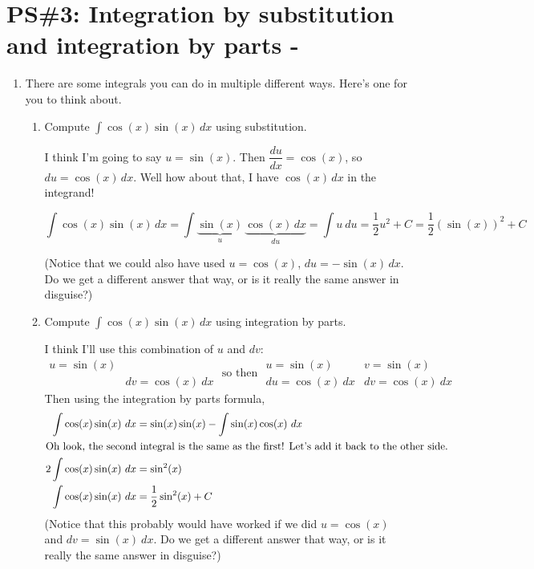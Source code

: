 


%


\allowdisplaybreaks
\section{PS\#3:  Integration by substitution and integration by parts -  }

\everymath{\displaystyle}
\begin{enumerate}[leftmargin=0pt]

\item There are some integrals you can do in multiple different ways. Here's one for you to think about.
\begin{enumerate}
    \item Compute $\int\cos(x)\sin(x)\, dx$ using substitution.
    
    \begin{red}
    I think I'm going to say $u = \sin(x)$. Then $\dfrac{du}{dx} = \cos(x)$, so $du = \cos(x)\, dx$. Well how about that, I have $\cos(x)\, dx$ in the integrand!
    
    \[\int\cos(x)\sin(x)\, dx = \int\underbrace{\sin(x)}_{u}\, \underbrace{\cos(x)\, dx}_{du} = \int u\ du = \frac12 u^2 + C = \frac12 (\sin(x))^2 + C\]
    
    (Notice that we could also have used $u = \cos(x)$, $du = -\sin(x)\, dx$. Do we get a different answer that way, or is it really the same answer in disguise?)
    \end{red}
    \item Compute $\int\cos(x)\sin(x)\, dx$ using integration by parts.
    
    \begin{red}
    I think I'll use this combination of $u$ and $dv$:
    \[\begin{array}{ll}
    u = \sin(x) & \\
     & dv = \cos(x)\ dx
    \end{array}
    \textrm{ so then }
    \begin{array}{ll}
        u = \sin(x) & v = \sin(x) \\
        du = \cos(x)\ dx & dv = \cos(x)\ dx
    \end{array}
    \]
    Then using the integration by parts formula, 
    \begin{align*}
        \int\cos(x)\sin(x)\ dx &= \sin(x)\sin(x) - \int\sin(x)\cos(x)\ dx \\
        \intertext{Oh look, the second integral is the same as the first! Let's add it back to the other side.}
        2\int\cos(x)\sin(x)\ dx &= \sin^2(x) \\
        \int\cos(x)\sin(x)\ dx &= \frac12 \sin^2(x) + C
    \end{align*}
    (Notice that this probably would have worked if we did $u = \cos(x)$ and $dv = \sin(x)\ dx$. Do we get a different answer that way, or is it really the same answer in disguise?)
    \end{red}
\end{enumerate}


\end{enumerate}
